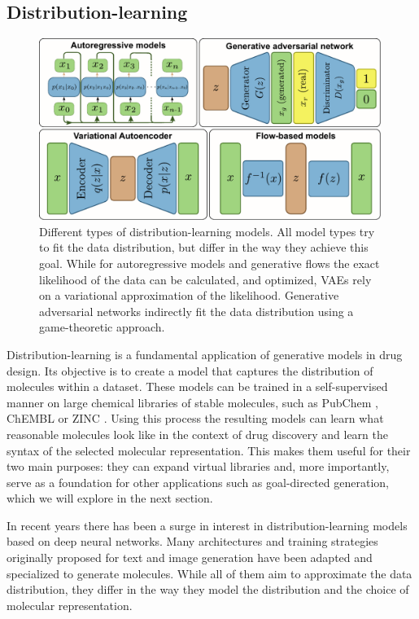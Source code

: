 \subsection{Distribution-learning}
\begin{figure}
      \centering
      \includegraphics[width=0.99\textwidth]{figures/distribution-learning-models.pdf}
      \caption{Different types of distribution-learning models. All model types
            try to fit the data distribution, but differ in the way they achieve this goal.
            While for autoregressive models and generative flows the exact likelihood of the data can be calculated,
            and optimized, VAEs rely on a variational approximation of the likelihood. Generative adversarial networks
            indirectly fit the data distribution using a game-theoretic approach. \label{fig:distribution-learning-models}}
\end{figure}
Distribution-learning is a fundamental application of generative models in drug design. Its
objective is to create a model that captures the distribution of molecules within a dataset. These
models can be trained in a self-supervised manner on large chemical libraries of stable molecules,
such as PubChem \citep{kimPubChemSubstanceCompound2016}, ChEMBL
\citep{bentoChEMBLBioactivityDatabase2014} or ZINC \citep{irwinZINCFreeTool2012}. Using this process
the resulting models can learn what reasonable molecules look like in the context of drug discovery
and learn the syntax of the selected molecular representation. This makes them useful for their two
main purposes: they can expand virtual libraries and, more importantly, serve as a foundation for other
applications such as goal-directed generation, which we will explore in the next section.

In recent years there has been a surge in interest in distribution-learning models based on deep neural
networks. Many architectures and training strategies originally proposed for text and image
generation have been adapted and specialized to generate molecules. While all of them aim to
approximate the data distribution, they differ in the way they model the distribution and the choice
of molecular representation.

